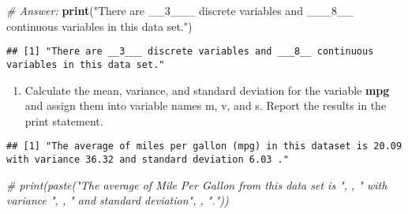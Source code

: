 \documentclass[
]{article}
\newenvironment{Shaded}{\begin{snugshade}}{\end{snugshade}}
\newcommand{\CommentTok}[1]{\textcolor[rgb]{0.56,0.35,0.01}{\textit{#1}}}
\newcommand{\DecValTok}[1]{\textcolor[rgb]{0.00,0.00,0.81}{#1}}
\newcommand{\FunctionTok}[1]{\textcolor[rgb]{0.13,0.29,0.53}{\textbf{#1}}}
\newcommand{\NormalTok}[1]{#1}
\newcommand{\OtherTok}[1]{\textcolor[rgb]{0.56,0.35,0.01}{#1}}
\newcommand{\SpecialCharTok}[1]{\textcolor[rgb]{0.81,0.36,0.00}{\textbf{#1}}}
\newcommand{\StringTok}[1]{\textcolor[rgb]{0.31,0.60,0.02}{#1}}
\providecommand{\tightlist}{%
  \setlength{\itemsep}{0pt}\setlength{\parskip}{0pt}}
\begin{document}
\begin{Shaded}
\begin{Highlighting}[]
\CommentTok{\# Answer:}
\FunctionTok{print}\NormalTok{(}\StringTok{"There are \_\_3\_\_\_ discrete variables and \_\_\_8\_\_ continuous variables in this data set."}\NormalTok{)}
\end{Highlighting}
\end{Shaded}

\begin{verbatim}
## [1] "There are __3___ discrete variables and ___8__ continuous variables in this data set."
\end{verbatim}

\begin{enumerate}
\def\labelenumi{\alph{enumi}.}
\setcounter{enumi}{2}
\tightlist
\item
  Calculate the mean, variance, and standard deviation for the variable
  \textbf{mpg} and assign them into variable names m, v, and s. Report
  the results in the print statement.
\end{enumerate}

\begin{Shaded}
\end{Shaded}

\begin{verbatim}
## [1] "The average of miles per gallon (mpg) in this dataset is 20.09 with variance 36.32 and standard deviation 6.03 ."
\end{verbatim}

\begin{Shaded}
\begin{Highlighting}[]
\CommentTok{\# print(paste("The average of Mile Per Gallon from this data set is ",  , " with variance ",  , " and standard deviation",  , "."))}
\end{Highlighting}
\end{Shaded}
\end{document}
